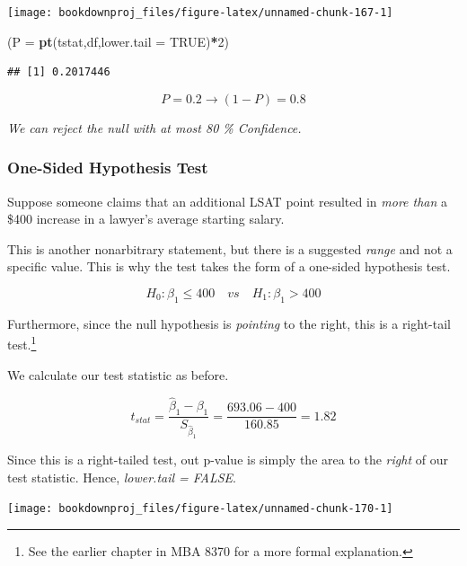 \documentclass[
]{book}
\newenvironment{Shaded}{\begin{snugshade}}{\end{snugshade}}
\newcommand{\AttributeTok}[1]{\textcolor[rgb]{0.13,0.29,0.53}{#1}}
\newcommand{\ConstantTok}[1]{\textcolor[rgb]{0.56,0.35,0.01}{#1}}
\newcommand{\DecValTok}[1]{\textcolor[rgb]{0.00,0.00,0.81}{#1}}
\newcommand{\FunctionTok}[1]{\textcolor[rgb]{0.13,0.29,0.53}{\textbf{#1}}}
\newcommand{\NormalTok}[1]{#1}
\newcommand{\SpecialCharTok}[1]{\textcolor[rgb]{0.81,0.36,0.00}{\textbf{#1}}}
\begin{document}
\begin{center}\texttt{[image: bookdownproj\_files/figure-latex/unnamed-chunk-167-1]} \end{center}

\begin{Shaded}
\begin{Highlighting}[]
\NormalTok{(}\AttributeTok{P =} \FunctionTok{pt}\NormalTok{(tstat,df,}\AttributeTok{lower.tail =} \ConstantTok{TRUE}\NormalTok{)}\SpecialCharTok{*}\DecValTok{2}\NormalTok{)}
\end{Highlighting}
\end{Shaded}

\begin{verbatim}
## [1] 0.2017446
\end{verbatim}

\[P = 0.2 \rightarrow (1-P) = 0.8\]

\emph{We can reject the null with at most 80 \% Confidence.}

\subsubsection*{One-Sided Hypothesis Test}\label{one-sided-hypothesis-test}

Suppose someone claims that an additional LSAT point resulted in \emph{more than} a \$400 increase in a lawyer's average starting salary.

This is another nonarbitrary statement, but there is a suggested \emph{range} and not a specific value. This is why the test takes the form of a one-sided hypothesis test.

\[H_0: \beta_1 \leq 400 \quad vs \quad H_1: \beta_1 > 400\]

Furthermore, since the null hypothesis is \emph{pointing} to the right, this is a right-tail test.\footnote{See the earlier chapter in MBA 8370 for a more formal explanation.}

We calculate our test statistic as before.

\[t_{stat} = \frac{\hat{\beta}_1 - \beta_1}{S_{\hat{\beta}_1}} = \frac{693.06 - 400}{160.85}=1.82\]

Since this is a right-tailed test, out p-value is simply the area to the \emph{right} of our test statistic. Hence, \emph{lower.tail = FALSE}.

\begin{center}\texttt{[image: bookdownproj\_files/figure-latex/unnamed-chunk-170-1]} \end{center}
\end{document}

